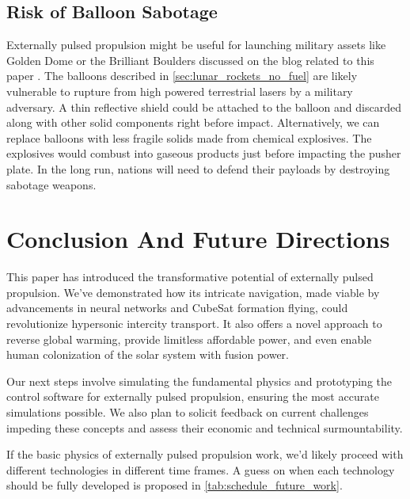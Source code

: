 \documentclass{article}
\begin{document}
\subsection{Risk of Balloon Sabotage}
Externally pulsed propulsion might be useful for launching military assets like Golden Dome \cite{lockheed_martin_golden_dome} or the Brilliant Boulders \cite{brilliant_boulders} discussed on the blog related to this paper \cite{aim2024}.   The balloons described in \autoref{sec:lunar_rockets_no_fuel} are likely vulnerable to rupture from high powered terrestrial lasers by a military adversary.  A thin reflective shield could be attached to the balloon and discarded along with other solid components right before impact.  Alternatively, we can replace balloons with less fragile solids made from chemical explosives.  The explosives would combust into gaseous products just before impacting the pusher plate. In the long run, nations will need to defend their payloads by destroying sabotage weapons.

\section{Conclusion And Future Directions}
This paper has introduced the transformative potential of externally pulsed propulsion. We've demonstrated how its intricate navigation, made viable by advancements in neural networks and CubeSat formation flying, could revolutionize hypersonic intercity transport.  It also offers a novel approach to reverse global warming, provide limitless affordable power, and even enable human colonization of the solar system with fusion power. 

Our next steps involve simulating the fundamental physics and prototyping the control software for externally pulsed propulsion, ensuring the most accurate simulations possible. We also plan to solicit feedback on current challenges impeding these concepts and assess their economic and technical surmountability.

If the basic physics of externally pulsed propulsion work, we'd likely proceed with different technologies in different time frames.  A guess on when each technology should be fully developed is proposed in \autoref{tab:schedule_future_work}.
\end{document}
